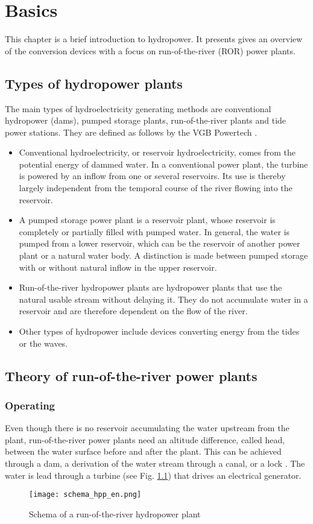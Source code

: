 \chapter{Basics}
\label{chap:basics}

This chapter is a brief introduction to hydropower. It presents gives an overview of the conversion devices with a focus on run-of-the-river (ROR) power plants.

\section{Types of hydropower plants}

The main types of hydroelectricity generating methods are conventional hydropower (dams), pumped storage plants, run-of-the-river plants and tide power stations. They are defined as follows by the VGB Powertech \cite{vgb}.

\begin{itemize}
 \item Conventional hydroelectricity, or reservoir hydroelectricity, comes from the potential energy of dammed water. In a conventional power plant, the turbine is powered by an inflow from one or several reservoirs. Its use is thereby largely independent from the temporal course of the river flowing into the reservoir.
 \item A pumped storage power plant is a reservoir plant, whose reservoir is completely or partially filled with pumped water. In general, the water is pumped from a lower reservoir, which can be the reservoir of another power plant or a natural water body. A distinction is made between pumped storage with or without natural inflow in the upper reservoir.
 \item Run-of-the-river hydropower plants are hydropower plants that use the natural usable stream without delaying it. They do not accumulate water in a reservoir and are therefore dependent on the flow of the river.
 \item Other types of hydropower include devices converting energy from the tides or the waves.
\end{itemize}


\section{Theory of run-of-the-river power plants}
\subsection{Operating}
Even though there is no reservoir accumulating the water upstream from the plant, run-of-the-river power plants need an altitude difference, called head, between the water surface before and after the plant. This can be achieved through a dam, a derivation of the water stream through a canal, or a lock \cite{tdi_petites_centrales}. The water is lead through a turbine (see Fig. \ref{schema_hpp}) that drives an electrical generator.
\begin{figure}[H]
\centering
\texttt{[image: schema\_hpp\_en.png]}
\caption[Schema of a run-of-the-river hydropower plant]{Schema of a run-of-the-river hydropower plant \cite{quaschning}}
\label{schema_hpp}
\end{figure}
